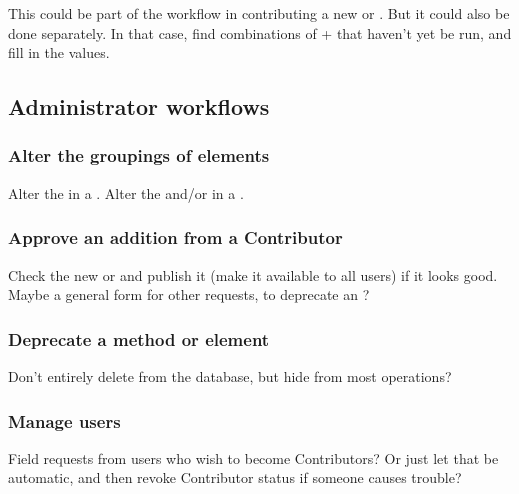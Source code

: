This could be part of the workflow in contributing a new \Method or \Element.
But it could also be done separately.
In that case, find combinations of \Method + \Element that haven't yet be run, and fill in the values.

\subsection{Administrator workflows}
\label{sec:workflows_admin}

\subsubsection{Alter the groupings of elements}

Alter the \Elements in a \Refset.
Alter the \Elements and/or \Refsets in a \Benchmark.

\subsubsection{Approve an addition from a Contributor}

Check the new \Method or \Element and publish it (make it available to all users) if it looks good.
Maybe a general form for other requests, \eg to deprecate an \Element?

\subsubsection{Deprecate a method or element}

Don't entirely delete from the database, but hide from most operations?

\subsubsection{Manage users}

Field requests from users who wish to become Contributors?
Or just let that be automatic, and then revoke Contributor status if someone causes trouble?

